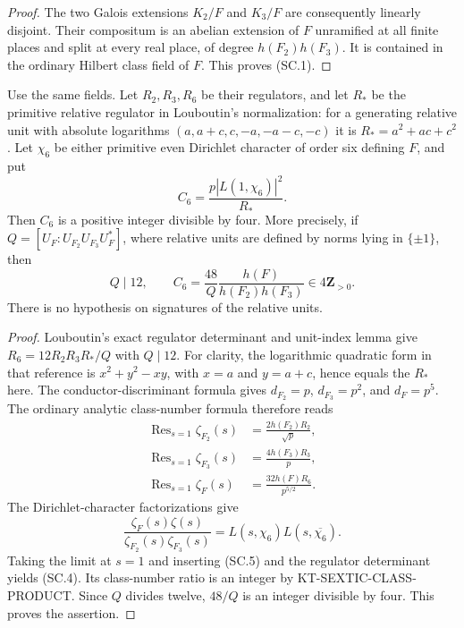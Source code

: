 \begin{proof}
The two Galois extensions $K_2/F$ and $K_3/F$ are consequently
linearly disjoint.  Their compositum is an abelian extension of $F$
unramified at all finite places and split at every real place, of
degree $h(F_2)h(F_3)$.  It is contained in the ordinary Hilbert
class field of $F$.  This proves (SC.1).
\end{proof}

\begin{corollary}
Use the same fields.  Let $R_2,R_3,R_6$ be their regulators, and let
$R_*$ be the primitive relative regulator in Louboutin's normalization:
for a generating relative unit with absolute logarithms
$(a,a+c,c,-a,-a-c,-c)$ it is $R_*=a^2+ac+c^2$.
Let $\chi_6$ be either primitive even Dirichlet character of order six
defining $F$, and put
\[
                       C_6=\frac{p|L(1,\chi_6)|^2}{R_*}.
 \tag{SC.3}
\]
Then $C_6$ is a positive integer divisible by four.  More precisely,
if $Q=[U_F:U_{F_2}U_{F_3}U_F^*]$, where relative units are defined
by norms lying in $\{\pm1\}$, then
\[
 Q\mid12,\qquad
 C_6=\frac{48}{Q}\frac{h(F)}{h(F_2)h(F_3)}\in4\mathbf Z_{>0}.
 \tag{SC.4}
\]
There is no hypothesis on signatures of the relative units.
\end{corollary}

\begin{proof}
Louboutin's exact regulator determinant and unit-index lemma give
$R_6=12R_2R_3R_*/Q$ with $Q\mid12$.
For clarity, the logarithmic quadratic form in that reference is
$x^2+y^2-xy$, with $x=a$ and $y=a+c$, hence equals the $R_*$ here.
The conductor-discriminant formula gives
$d_{F_2}=p$, $d_{F_3}=p^2$, and $d_F=p^5$.
The ordinary analytic class-number formula therefore reads
\[
 \begin{aligned}
 \operatorname{Res}_{s=1}\zeta_{F_2}(s)&=\frac{2h(F_2)R_2}{\sqrt p},\\
 \operatorname{Res}_{s=1}\zeta_{F_3}(s)&=\frac{4h(F_3)R_3}{p},\\
 \operatorname{Res}_{s=1}\zeta_F(s)&=\frac{32h(F)R_6}{p^{5/2}}.
 \end{aligned}
 \tag{SC.5}
\]
The Dirichlet-character factorizations give
\[
 \frac{\zeta_F(s)\zeta(s)}{\zeta_{F_2}(s)\zeta_{F_3}(s)}
       =L(s,\chi_6)L(s,\overline{\chi_6}).
\]
Taking the limit at $s=1$ and inserting (SC.5) and the regulator
determinant yields (SC.4).  Its class-number ratio is an integer
by KT-SEXTIC-CLASS-PRODUCT.  Since $Q$ divides twelve, $48/Q$ is
an integer divisible by four.  This proves the assertion.
\end{proof}

